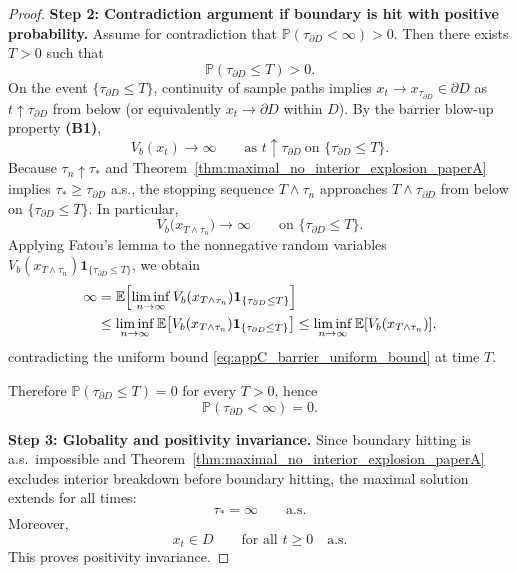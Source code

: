 \documentclass[10pt,a4paper]{amsart}
\begin{document}
\begin{proof}
\medskip
\noindent\textbf{Step 2: Contradiction argument if boundary is hit with positive probability.}
Assume for contradiction that \(\mathbb P(\tau_{\partial D}<\infty)>0\). Then there exists \(T>0\) such that
\[
\mathbb P(\tau_{\partial D}\le T)>0.
\]
On the event \(\{\tau_{\partial D}\le T\}\), continuity of sample paths implies \(x_t\to x_{\tau_{\partial D}}\in\partial D\) as \(t\uparrow \tau_{\partial D}\) from below (or equivalently \(x_t\to \partial D\) within \(D\)). By the barrier blow-up property \textbf{(B1)},
\[
V_b(x_t)\to\infty\qquad \text{as }t\uparrow \tau_{\partial D}\ \text{on }\{\tau_{\partial D}\le T\}.
\]
Because \(\tau_n\uparrow \tau_*\) and Theorem~\ref{thm:maximal_no_interior_explosion_paperA} implies \(\tau_*\ge \tau_{\partial D}\) a.s., the stopping sequence \(T\wedge \tau_n\) approaches \(T\wedge \tau_{\partial D}\) from below on \(\{\tau_{\partial D}\le T\}\). In particular,
\begin{equation}
\label{eq:appC_barrier_divergence}
V_b\bigl(x_{T\wedge \tau_n}\bigr)\to\infty
\qquad\text{on }\{\tau_{\partial D}\le T\}.
\end{equation}
Applying Fatou's lemma to the nonnegative random variables \(V_b(x_{T\wedge \tau_n})\mathbf 1_{\{\tau_{\partial D}\le T\}}\), we obtain
\begin{align}
\infty
&=
\mathbb E\!\left[\liminf_{n\to\infty}V_b(x_{T\wedge \tau_n})\mathbf 1_{\{\tau_{\partial D}\le T\}}\right] \notag\\
&\le
\liminf_{n\to\infty}\mathbb E\!\left[V_b(x_{T\wedge \tau_n})\mathbf 1_{\{\tau_{\partial D}\le T\}}\right]
\le
\liminf_{n\to\infty}\mathbb E[V_b(x_{T\wedge \tau_n})],
\label{eq:appC_fatou_contradiction}
\end{align}
contradicting the uniform bound \eqref{eq:appC_barrier_uniform_bound} at time \(T\).

Therefore \(\mathbb P(\tau_{\partial D}\le T)=0\) for every \(T>0\), hence
\[
\mathbb P(\tau_{\partial D}<\infty)=0.
\]

\medskip
\noindent\textbf{Step 3: Globality and positivity invariance.}
Since boundary hitting is a.s.\ impossible and Theorem~\ref{thm:maximal_no_interior_explosion_paperA} excludes interior breakdown before boundary hitting, the maximal solution extends for all times:
\[
\tau_*=\infty\qquad\text{a.s.}
\]
Moreover,
\[
x_t\in D\qquad \text{for all }t\ge0\quad\text{a.s.}
\]
This proves positivity invariance.
\end{proof}
\end{document}
